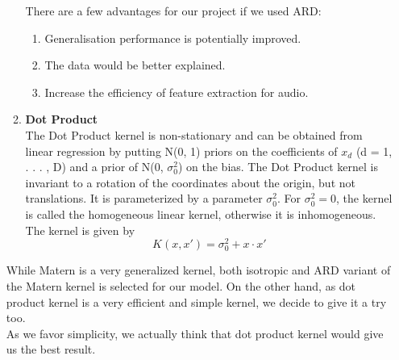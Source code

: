 \documentclass{article}
\begin{document}
\begin{enumerate}
\begin{enumerate}
			There are a few advantages for our project if we used ARD: \cite{Cawley2014}
			\begin{enumerate}
				\item Generalisation performance is potentially improved.
				\item The data would be better explained.
				\item Increase the efficiency of feature extraction for audio.
			\end{enumerate}
			
			\item \textbf{Dot Product}\\
			The Dot Product kernel is non-stationary and can be obtained from linear regression by putting N(0, 1) priors on the coefficients 
			of \(x_{d}\) (d = 1, . . . , D) and a prior of N(0, \(\sigma_{0}^{2}\)) on the bias. 
			The Dot Product kernel is invariant to a rotation of the coordinates about the origin, but not translations. 
			It is parameterized by a parameter \(\sigma_{0}^{2}\). For \(\sigma_{0}^{2} = 0\), 
			the kernel is called the homogeneous linear kernel, otherwise it is inhomogeneous. The kernel is given by
			\begin{equation}\label{eq:kernel_dp}
				K(x,x') = \sigma_{0}^{2} + x \cdot x'  
			\end{equation}
		\end{enumerate}

		While Matern is a very generalized kernel, both isotropic and ARD variant of the Matern kernel is selected for our model. 
		On the other hand, as dot product kernel is a very efficient and simple kernel, 
		we decide to give it a try too. \\
		As we favor simplicity, we actually think that dot product kernel would give us the best result.
	\end{enumerate}
\end{document}
